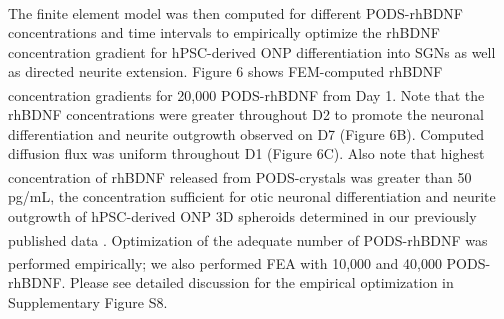 \documentclass[review]{elsarticle}
\begin{document}
The finite element model was then computed for different PODS\textsuperscript{\textregistered}-rhBDNF concentrations and time intervals to empirically optimize the rhBDNF concentration gradient for hPSC-derived ONP differentiation into SGNs as well as directed neurite extension. Figure 6 shows FEM-computed rhBDNF concentration gradients for 20,000 PODS\textsuperscript{\textregistered}-rhBDNF from Day 1. Note that the rhBDNF concentrations were greater throughout D2 to promote the neuronal differentiation and neurite outgrowth observed on D7 (Figure 6B). Computed diffusion flux was uniform throughout D1 (Figure 6C). Also note that highest concentration of rhBDNF released from PODS\textsuperscript{\textregistered}-crystals was greater than 50 pg/mL, the concentration sufficient for otic neuronal differentiation and neurite outgrowth of hPSC-derived ONP 3D spheroids determined in our previously published data \cite{Chang2020}. Optimization of the adequate number of PODS\textsuperscript{\textregistered}-rhBDNF was performed empirically; we also performed FEA with 10,000 and 40,000 PODS\textsuperscript{\textregistered}-rhBDNF. Please see detailed discussion for the empirical optimization in Supplementary Figure S8. 
\end{document}
